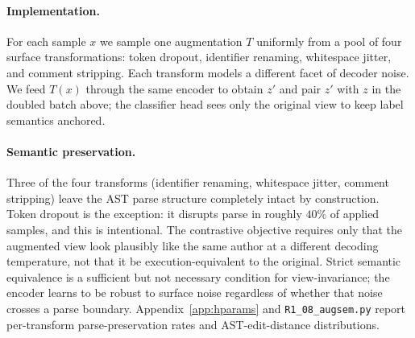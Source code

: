 ﻿\documentclass[11pt]{article}
\begin{document}
\paragraph{Implementation.} For each sample $x$ we sample one
augmentation $T$ uniformly from a pool of four surface
transformations: token dropout, identifier renaming, whitespace
jitter, and comment stripping. Each transform models a different
facet of decoder noise. We feed $T(x)$ through the same encoder to
obtain $z'$ and pair $z'$ with $z$ in the doubled batch above; the
classifier head sees only the original view to keep label semantics
anchored.

\paragraph{Semantic preservation.}
Three of the four transforms (identifier renaming, whitespace
jitter, comment stripping) leave the AST parse structure
completely intact by construction. Token dropout is the exception:
it disrupts parse in roughly $40\%$ of applied samples, and this
is intentional. The contrastive objective requires only that the
augmented view look plausibly like the same author at a different
decoding temperature, not that it be execution-equivalent to the
original. Strict semantic equivalence is a sufficient but not
necessary condition for view-invariance; the encoder learns to be
robust to surface noise regardless of whether that noise crosses
a parse boundary. Appendix~\ref{app:hparams} and
\texttt{R1\_08\_augsem.py} report per-transform parse-preservation
rates and AST-edit-distance distributions.
\end{document}
